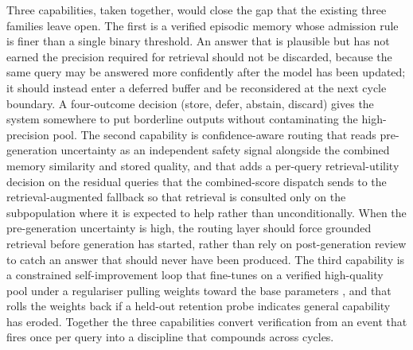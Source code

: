 Three capabilities, taken together, would close the gap that the existing three families leave open. The first is a verified episodic memory whose admission rule is finer than a single binary threshold. An answer that is plausible but has not earned the precision required for retrieval should not be discarded, because the same query may be answered more confidently after the model has been updated; it should instead enter a deferred buffer and be reconsidered at the next cycle boundary. A four-outcome decision (store, defer, abstain, discard) gives the system somewhere to put borderline outputs without contaminating the high-precision pool. The second capability is confidence-aware routing that reads pre-generation uncertainty as an independent safety signal alongside the combined memory similarity and stored quality, and that adds a per-query retrieval-utility decision on the residual queries that the combined-score dispatch sends to the retrieval-augmented fallback so that retrieval is consulted only on the subpopulation where it is expected to help rather than unconditionally. When the pre-generation uncertainty is high, the routing layer should force grounded retrieval before generation has started, rather than rely on post-generation review to catch an answer that should never have been produced. The third capability is a constrained self-improvement loop that fine-tunes on a verified high-quality pool under a regulariser pulling weights toward the base parameters \cite{doi:10.1073/pnas.1611835114}, and that rolls the weights back if a held-out retention probe indicates general capability has eroded. Together the three capabilities convert verification from an event that fires once per query into a discipline that compounds across cycles.


